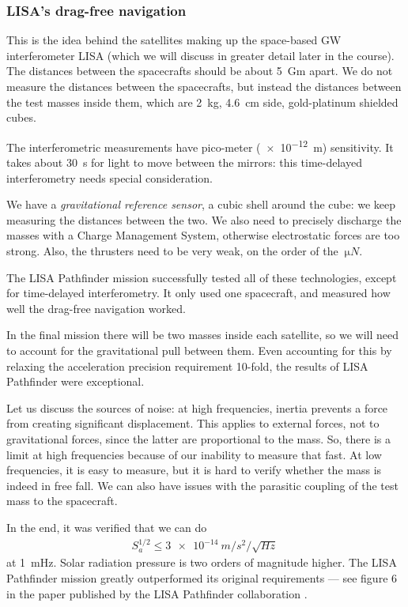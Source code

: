 \documentclass[main.tex]{subfiles}
\begin{document}
\subsubsection{LISA's drag-free navigation}

This is the idea behind the satellites making up the space-based GW interferometer LISA (which we will discuss in greater detail later in the course). 
The distances between the spacecrafts should be about \SI{5}{Gm} apart.
We do not measure the distances between the spacecrafts, but instead the distances between the test masses inside them, which are \SI{2}{kg}, \SI{4.6}{cm} side, gold-platinum shielded cubes. 

The interferometric measurements have pico-meter (\SI{e-12}{m}) sensitivity. 
It takes about \SI{30}{s} for light to move between the mirrors: this time-delayed interferometry needs special consideration. 

We have a \emph{gravitational reference sensor}, a cubic shell around the cube: we keep measuring the distances between the two. 
We also need to precisely discharge the masses with a Charge Management System, otherwise electrostatic forces are too strong.
Also, the thrusters need to be very weak, on the order of the \(\SI{}{\micro N }\). 

The LISA Pathfinder mission successfully tested all of these technologies, except for time-delayed interferometry. 
It only used one spacecraft, and measured how well the drag-free navigation worked. 

In the final mission there will be two masses inside each satellite, so we will need to account for the gravitational pull between them. 
Even accounting for this by relaxing the acceleration precision requirement 10-fold, the results of LISA Pathfinder were exceptional. 

Let us discuss the sources of noise: at high frequencies, inertia prevents a force from creating significant displacement. 
This applies to external forces, not to gravitational forces, since the latter are proportional to the mass.
So, there is a limit at high frequencies because of our inability to measure that fast. 
At low frequencies, it is easy to measure, but it is hard to verify whether the mass is indeed in free fall. 
We can also have issues with the parasitic coupling of the test mass to the spacecraft. 

In the end, it was verified that we can do 
%
\begin{align}
S^{1/2}_{a} \leq \SI{3e-14}{m / s^2 / \sqrt{Hz}}
\,
\end{align}
%
at \SI{1}{mHz}.
Solar radiation pressure is two orders of magnitude higher. 
The LISA Pathfinder mission greatly outperformed its original requirements --- see figure 6 in the paper published by the LISA Pathfinder collaboration \cite[]{lisapathfindercollaborationLISAPathfinderFirst2017}. 
\end{document}
